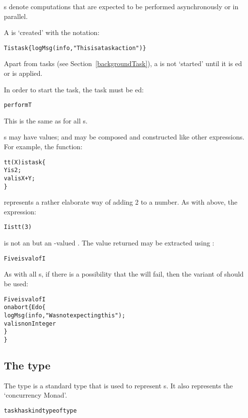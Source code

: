 s denote computations that are expected to be performed asynchronously or in parallel.

A  is `created' with the  notation:
\begin{alltt}
T is task\{ logMsg(info,"This is a task action") \}
\end{alltt}
\begin{aside}
Apart from  tasks (see Section~\vref{backgroundTask}), a  is not `started' until it is ed or  is applied.
\end{aside}
In order to start the task, the task must be ed:
\begin{alltt}
perform T
\end{alltt}
This is the same as for all s.

s may have values; and may be composed and constructed like other expressions. For example, the function:
\begin{alltt}
tt(X) is task\{
  Y is 2;
  valis X+Y;
\}
\end{alltt}
represents a rather elaborate way of adding 2 to a number. As with  above, the expression:
\begin{alltt}
I is tt(3)
\end{alltt}
is not an  but an -valued . The value returned may be extracted using :
\begin{alltt}
Five is valof I
\end{alltt}
As with all s, if there is a possibility that the  will fail, then the  variant of  should be used:
\begin{alltt}
Five is valof I 
  on abort \{ E do \{ 
    logMsg(info,"Was not expecting this");
    valis nonInteger
  \}
\}
\end{alltt}

\subsection{The  type}
\label{taskType}
The  type is a standard type that is used to represent s. It also represents the `concurrency Monad'.

\begin{alltt}
task has kind type of type
\end{alltt}

